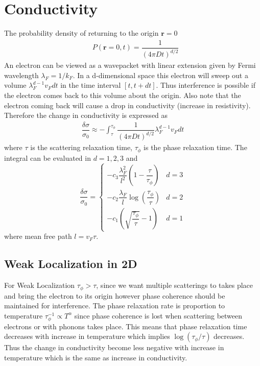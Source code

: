 \documentclass[aps,prb,onecolumn,notitlepage,showpacs,floatfix,superscriptaddress]{revtex4-1}
\begin{document}
\section{Conductivity}
The probability density of returning to the origin ${\bm r}=0$
\begin{equation}
\begin{split}
& P({\bm r}=0,t)= \dfrac{1}{(4\pi Dt)^{d/2}} 
\end{split}
\end{equation}
An electron can be viewed as a wavepacket with linear extension given by Fermi wavelength $\lambda_F=1/k_F$. In a d-dimensional space this electron will sweep out a volume $\lambda_F^{d-1} v_F dt$ in the time interval $[t,t+dt]$. Thus interference is possible if the electron comes back to this volume about the origin. Also note that the electron coming back will cause a drop in conductivity (increase in resistivity). Therefore the change in conductivity is expressed as
\begin{equation}
\begin{split}
\dfrac{\delta \sigma}{\sigma_0} \approx - \int_{\tau}^{\tau_{\phi}} \dfrac{1}{(4\pi Dt)^{d/2}} \lambda_F^{d-1} v_F dt
\end{split}
\end{equation}
where $\tau$ is the scattering relaxation time, $\tau_{\phi}$ is the phase relaxation time. The integral can be evaluated in $d=1,2,3$ and 
\[ \dfrac{\delta \sigma}{\sigma_0} =\begin{cases} 
      -c_3 \dfrac{\lambda_F^2}{l^2} \left(1-\dfrac{\tau}{\tau_\phi} \right) & d=3 \\
      -c_2 \dfrac{\lambda_F}{l}\log\left(\dfrac{\tau_\phi}{\tau} \right)  & d=2 \\
      -c_1 \left( \sqrt{\dfrac{\tau_\phi}{\tau}}-1\right) & d=1 
   \end{cases}
\]
where mean free path $l=v_F \tau$. \\

\subsection{Weak Localization in 2D}
For Weak Localization $\tau_\phi > \tau$, since we want multiple scatterings to takes place and bring the electron to its origin however phase coherence should be maintained for interference. The phase relaxation rate is proportion to temperature $\tau_\phi^{-1} \propto T^\alpha$ since phase coherence is lost when scattering between electrons or with phonons takes place. This means that phase relaxation time decreases with increase in temperature which implies $\log(\tau_\phi / \tau)$ decreases. Thus the change in conductivity become less negative with increase in temperature which is the same as increase in conductivity.
\end{document}
